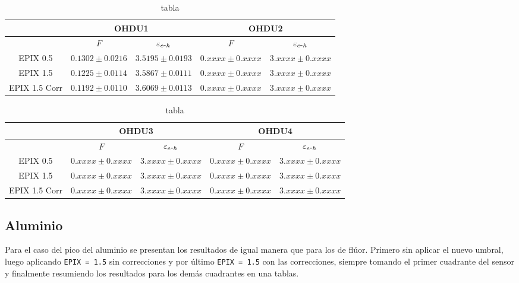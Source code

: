 \begin{table}[H]
\centering
\begin{tabular}{@{}ccccc@{}}
\toprule
                & \multicolumn{2}{c}{OHDU1}                 & \multicolumn{2}{c}{OHDU2}                 \\ \hline\hline
                & $F$                 & $\varepsilon_{e\mbox{-}h}$ & $F$                 & $\varepsilon_{e\mbox{-}h}$ \\
EPIX 0.5 & $0.1302 \pm 0.0216$ & $3.5195 \pm 0.0193$ & $0.xxxx \pm 0.xxxx$ & $3.xxxx \pm 0.xxxx$ \\
EPIX 1.5 & $0.1225 \pm 0.0114$ & $3.5867 \pm 0.0111$ & $0.xxxx \pm 0.xxxx$ & $3.xxxx \pm 0.xxxx$ \\
EPIX 1.5 Corr & $0.1192 \pm 0.0110$ & $3.6069 \pm 0.0113$ & $0.xxxx \pm 0.xxxx$ & $3.xxxx \pm 0.xxxx$ \\ \bottomrule
\end{tabular}
\caption{tabla}
\label{tab:F_FanoEehOHDU1y2}
\end{table}


\begin{table}[H]
\centering
\begin{tabular}{@{}ccccc@{}}
\toprule
                & \multicolumn{2}{c}{OHDU3}                 & \multicolumn{2}{c}{OHDU4}                 \\ \hline\hline
                & $F$                 & $\varepsilon_{e\mbox{-}h}$ & $F$                 & $\varepsilon_{e\mbox{-}h}$ \\
EPIX 0.5 & $0.xxxx \pm 0.xxxx $ & $3.xxxx \pm 0.xxxx $ & $0.xxxx \pm 0.xxxx $ & $3.xxxx \pm 0.xxxx $ \\ 
EPIX 1.5 & $0.xxxx \pm 0.xxxx $ & $3.xxxx \pm 0.xxxx $ & $0.xxxx \pm 0.xxxx $ & $3.xxxx \pm 0.xxxx $ \\ 
EPIX 1.5 Corr& $0.xxxx \pm 0.xxxx $ & $3.xxxx \pm 0.xxxx$ & $0.xxxx \pm 0.xxxx $ & $3.xxxx \pm 0.xxxx $ \\ \bottomrule
\end{tabular}
\caption{tabla}
\label{tab:F_FanoEehOHDU3y4}
\end{table}


\subsection{Aluminio}
\noindent Para el caso del pico del aluminio se presentan los resultados de igual manera que para los de flúor. Primero sin aplicar el nuevo umbral, luego aplicando \verb|EPIX = 1.5| sin correcciones y por último \verb|EPIX = 1.5| con las correcciones, siempre tomando el primer cuadrante del sensor y finalmente resumiendo los resultados para los demás cuadrantes en una tablas.

